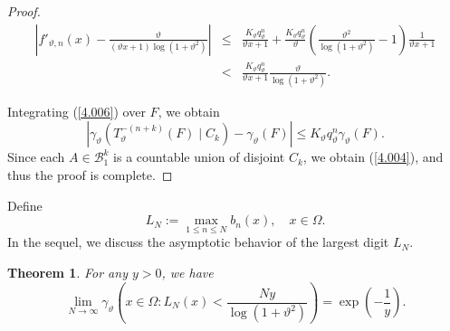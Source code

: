 \documentclass[final,1p,times]{elsarticle}
\newtheorem{theorem}{Theorem}[section]
\numberwithin{equation}{section}
\begin{document}
\begin{proof}
\begin{eqnarray}
\left| f'_{\vartheta, n}(x) - \frac{\vartheta}{(\vartheta x + 1)\log(1 + \vartheta^2)} \right| &\leq& \frac{K_{\vartheta} q^n_{\vartheta}}{\vartheta x + 1} + \frac{K_{\vartheta} q^n_{\vartheta}}{\vartheta} \left( \frac{\vartheta^2}{\log(1 + \vartheta^2)} - 1 \right) \frac{1}{\vartheta x + 1} \nonumber \\ 
&<& \frac{K_{\vartheta} q^n_{\vartheta}}{\vartheta x + 1} \frac{\vartheta}{\log(1 + \vartheta^2)}. \label{4.006}
\end{eqnarray}

Integrating (\ref{4.006}) over \( F \), we obtain
\[
\left| \gamma_{\vartheta} \left( T^{-(n+k)}_{\vartheta}(F) \mid C_k \right) - \gamma_{\vartheta}(F) \right| \leq K_{\vartheta} q^n_{\vartheta} \gamma_{\vartheta}(F).
\]
Since each \( A \in \mathcal{B}_1^k \) is a countable union of disjoint \( C_k \), we obtain (\ref{4.004}), and thus the proof is complete.
\end{proof}
Define 
\[
L_N := \max_{1 \leq n \leq N} b_n(x), \quad x \in \Omega.
\]
In the sequel, we discuss the asymptotic behavior of the largest digit \( L_N \).

\begin{theorem} \label{Th.4.4}
For any \( y > 0 \), we have
\begin{equation} \label{4.0700}
\lim_{N \to \infty} \gamma_{\vartheta}\left( x \in \Omega: L_N(x) < \frac{N y}{\log(1+\vartheta^2)} \right) = \exp\left( -\frac{1}{y}\right).
\end{equation}
\end{theorem}
\end{document}
